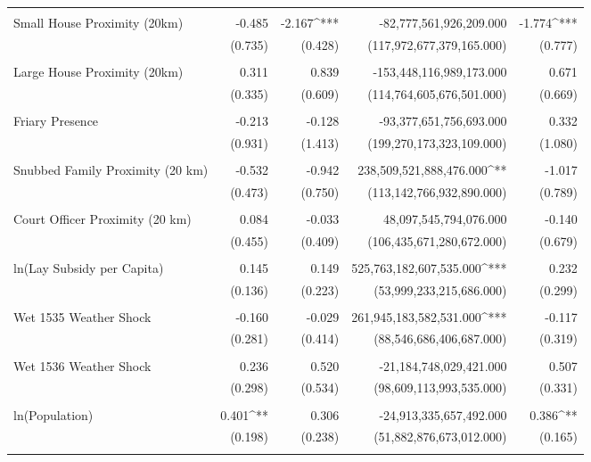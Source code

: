 \begin{table}[H]
\begin{tabular}{@{\extracolsep{.5pt}}lD{.}{.}{-3} D{.}{.}{-3} D{.}{.}{-3} D{.}{.}{-3} }
  & & & & \\ 
 Small House Proximity (20km) & -0.485 & -2.167^{***} & -82,777,561,926,209.000 & -1.774^{***} \\ 
  & (0.735) & (0.428) & (117,972,677,379,165.000) & (0.777) \\ 
  & & & & \\ 
 Large House Proximity (20km) & 0.311 & 0.839 & -153,448,116,989,173.000 & 0.671 \\ 
  & (0.335) & (0.609) & (114,764,605,676,501.000) & (0.669) \\ 
  & & & & \\ 
 Friary Presence & -0.213 & -0.128 & -93,377,651,756,693.000 & 0.332 \\ 
  & (0.931) & (1.413) & (199,270,173,323,109.000) & (1.080) \\ 
  & & & & \\ 
 Snubbed Family Proximity (20 km) & -0.532 & -0.942 & 238,509,521,888,476.000^{**} & -1.017 \\ 
  & (0.473) & (0.750) & (113,142,766,932,890.000) & (0.789) \\ 
  & & & & \\ 
 Court Officer Proximity (20 km) & 0.084 & -0.033 & 48,097,545,794,076.000 & -0.140 \\ 
  & (0.455) & (0.409) & (106,435,671,280,672.000) & (0.679) \\ 
  & & & & \\ 
 ln(Lay Subsidy per Capita) & 0.145 & 0.149 & 525,763,182,607,535.000^{***} & 0.232 \\ 
  & (0.136) & (0.223) & (53,999,233,215,686.000) & (0.299) \\ 
  & & & & \\ 
 Wet 1535 Weather Shock & -0.160 & -0.029 & 261,945,183,582,531.000^{***} & -0.117 \\ 
  & (0.281) & (0.414) & (88,546,686,406,687.000) & (0.319) \\ 
  & & & & \\ 
 Wet 1536 Weather Shock & 0.236 & 0.520 & -21,184,748,029,421.000 & 0.507 \\ 
  & (0.298) & (0.534) & (98,609,113,993,535.000) & (0.331) \\ 
  & & & & \\ 
 ln(Population) & 0.401^{**} & 0.306 & -24,913,335,657,492.000 & 0.386^{**} \\ 
  & (0.198) & (0.238) & (51,882,876,673,012.000) & (0.165) \\ 
  & & & & \\ 

\end{tabular}
\end{table}
